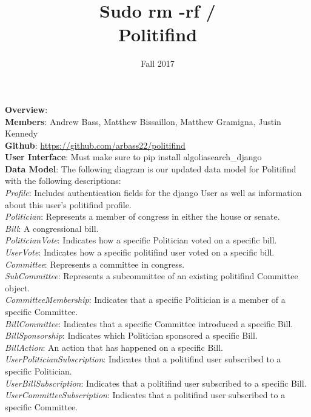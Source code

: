 \documentclass{article}
\newcommand{\n}{\noindent}
\begin{document}
\title{Sudo rm -rf / \\ \large{Politifind}}
\author{Fall 2017}
\date{}
\maketitle

\n\textbf{Overview}:\\

\n\textbf{Members}: Andrew Bass, Matthew Bissaillon, Matthew Gramigna, Justin Kennedy \\

\n\textbf{Github}: \url{https://github.com/arbass22/politifind} \\

\n\textbf{User Interface}: Must make sure to pip install algoliasearch_django\\

\n\textbf{Data Model}: The following diagram is our updated data model for Politifind with the following descriptions: \\ 

\n\textit{Profile}: Includes authentication fields for the django User as well as information about this user's politifind profile. \\
\n\textit{Politician}: Represents a member of congress in either the house or senate. \\
\n\textit{Bill}: A congressional bill.\\
\n\textit{PoliticianVote}: Indicates how a specific Politician voted on a specific bill. \\
\n\textit{UserVote}: Indicates how a specific politifind user voted on a specific bill.\\
\n\textit{Committee}: Represents a committee in congress. \\
\n\textit{SubCommittee}: Represents a subcommittee of an existing politifind Committee object. \\
\n\textit{CommitteeMembership}: Indicates that a specific Politician is a member of a specific Committee. \\
\n\textit{BillCommittee}: Indicates that a specific Committee introduced a specific Bill. \\
\n\textit{BillSponsorship}: Indicates which Politician sponsored a specific Bill. \\
\n\textit{BillAction}: An action that has happened on a specific Bill. \\
\n\textit{UserPoliticianSubscription}: Indicates that a politifind user subscribed to a specific Politician. \\
\n\textit{UserBillSubscription}: Indicates that a politifind user subscribed to a specific Bill.\\
\n\textit{UserCommitteeSubscription}: Indicates that a politifind user subscribed to a specific Committee.\\
\end{document}
